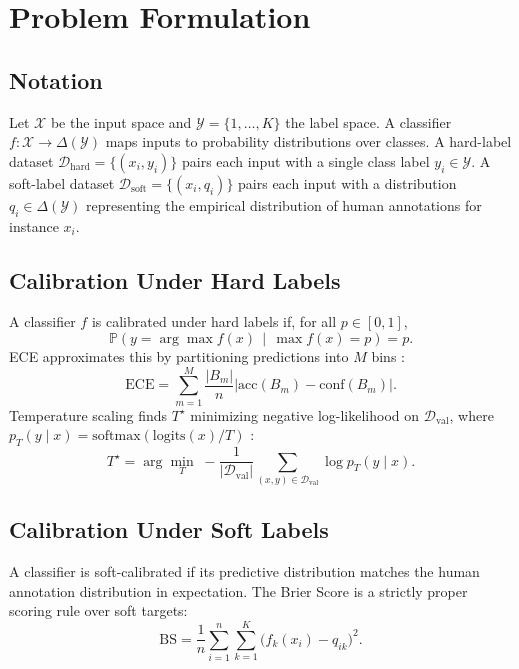 \documentclass[11pt,a4paper]{article}
\theoremstyle{definition}
\begin{document}
\section{Problem Formulation}
\label{sec:problem}

\subsection{Notation}

Let $\mathcal{X}$ be the input space and
$\mathcal{Y}=\{1,\ldots,K\}$ the label space. A classifier
$f:\mathcal{X}\rightarrow\Delta(\mathcal{Y})$ maps inputs to probability
distributions over classes. A hard-label dataset
$\mathcal{D}_{\mathrm{hard}}=\{(x_i,y_i)\}$ pairs each input with a
single class label $y_i\in\mathcal{Y}$. A soft-label dataset
$\mathcal{D}_{\mathrm{soft}}=\{(x_i,q_i)\}$ pairs each input with a
distribution $q_i\in\Delta(\mathcal{Y})$ representing the empirical
distribution of human annotations for instance $x_i$.

\subsection{Calibration Under Hard Labels}

A classifier $f$ is calibrated under hard labels if, for all
$p\in[0,1]$,
\[
\mathbb{P}\!\left(y=\arg\max f(x)\,\middle|\,\max f(x)=p\right)=p.
\]
ECE approximates this by partitioning predictions into $M$ bins
\cite{Guo2017}:
\begin{equation}
\mathrm{ECE}=\sum_{m=1}^{M}\frac{|B_m|}{n}\left|\mathrm{acc}(B_m)-\mathrm{conf}(B_m)\right|.
\end{equation}
Temperature scaling finds $T^\star$ minimizing negative log-likelihood
on $\mathcal{D}_{\mathrm{val}}$, where
$p_T(y\mid x)=\mathrm{softmax}(\mathrm{logits}(x)/T)$ \cite{Guo2017}:
\begin{equation}
T^\star=\arg\min_T\;
-\frac{1}{|\mathcal{D}_{\mathrm{val}}|}
\sum_{(x,y)\in\mathcal{D}_{\mathrm{val}}}
\log p_T(y\mid x).
\end{equation}

\subsection{Calibration Under Soft Labels}

A classifier is soft-calibrated if its predictive distribution matches
the human annotation distribution in expectation. The Brier Score
\cite{Brier1950} is a strictly proper scoring rule over soft targets:
\begin{equation}
\mathrm{BS}=\frac{1}{n}\sum_{i=1}^{n}\sum_{k=1}^{K}
\bigl(f_k(x_i)-q_{ik}\bigr)^2.
\end{equation}
\end{document}
